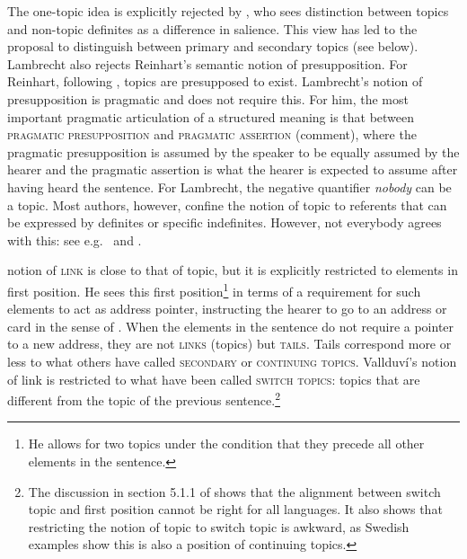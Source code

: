 \documentclass[output=paper,hidelinks]{langscibook}
\begin{document}
The one-topic idea is explicitly rejected by \citet{Lambrecht}, who sees  distinction between topics and non-topic definites as a difference in salience.  This view has led to the proposal to distinguish between primary and secondary topics (see below). Lambrecht also rejects Reinhart's semantic notion of presupposition. For Reinhart, following \citet{Strawson1964}, topics are presupposed to exist. Lambrecht's notion of presupposition is pragmatic and does not require this. For him, the most important pragmatic articulation of a structured meaning is that between \textsc{pragmatic presupposition} and \textsc{pragmatic assertion} (comment), where the pragmatic  presupposition is assumed by the speaker to be equally assumed by the hearer and the pragmatic assertion is what the hearer is expected to assume after having heard the sentence. For Lambrecht, the negative quantifier \textit{nobody} can be a topic. Most authors, however, confine the notion of topic to referents that can be expressed by definites or specific indefinites. However, not everybody agrees with this: see e.g.\ \citet{Endriss09} and \citet{GK}. 

 notion of \textsc{link} is close to that of topic,  but it is explicitly restricted to elements in first position. He sees this first position\footnote{He allows for two topics under the condition that they precede all other elements in the sentence.} in terms of a requirement for such elements to act as address pointer, instructing the hearer to go to an address or card in the sense of \citet{Heim82}.  When the elements in the sentence do not require a pointer to a new address, they are not \textsc{links} (topics) but \textsc{tails}. Tails correspond more or less to what others have called \textsc{secondary} or \textsc{continuing topics}. Vallduví's notion of link is restricted to what have been called \textsc{switch topics}: topics that are different from the topic of the previous sentence.\footnote{The discussion in section 5.1.1 of \citet{VallduviEngdahl} shows that the alignment between switch topic and first position cannot be right for all languages. It also shows that restricting the notion of topic to switch topic is awkward,  as Swedish examples show this is also a position of continuing topics.} 
\end{document}
